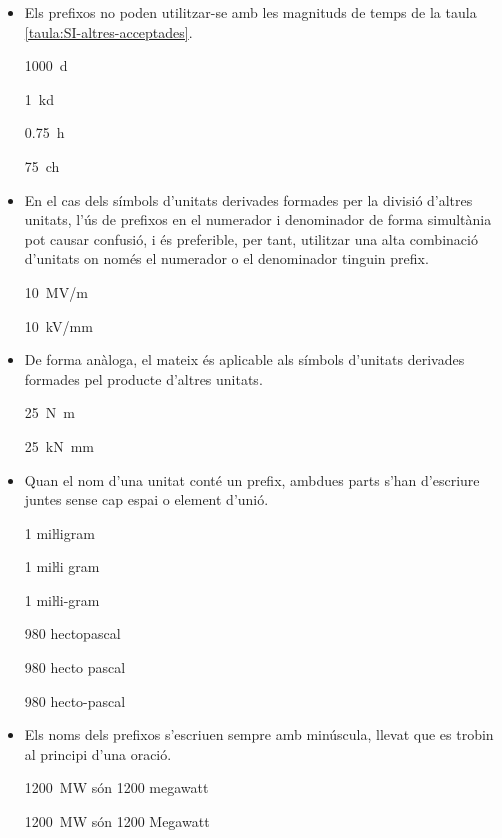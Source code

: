 \begin{itemize}
\item Els prefixos no poden utilitzar-se amb les magnituds  de temps de la taula \vref{taula:SI-altres-acceptades}.

\textcolor{Green}\faCheckSquare{} \qty{1000}{d}

\textcolor{Red}\faTimesCircle{}  \qty{1}{kd}

\textcolor{Green}\faCheckSquare{} \qty{0,75}{h}

\textcolor{Red}\faTimesCircle{}  \qty{75}{ch}


\item En el cas dels símbols d'unitats derivades formades per la divisió
d'altres unitats, l'ús de prefixos en el numerador i denominador de
forma simultània pot causar confusió, i és preferible, per tant,
utilitzar una alta combinació d'unitats on només el numerador o el
denominador tinguin prefix.

\textcolor{Green}\faCheckSquare{} \qty{10}{MV/m}

\textcolor{Blue}\faExclamationTriangle{}  \qty{10}{kV/mm}


\item De forma anàloga, el mateix és aplicable als símbols d'unitats
derivades formades pel producte d'altres unitats.

\textcolor{Green}\faCheckSquare{} \qty{25}{N.m}

\textcolor{Blue}\faExclamationTriangle{}  \qty{25}{kN.mm}


 \item Quan el nom d'una unitat
conté un prefix, ambdues parts s'han d'escriure juntes sense cap espai o element d'unió.

\textcolor{Green}\faCheckSquare{} 1 miŀligram

\textcolor{Red}\faTimesCircle{} 1 miŀli gram

\textcolor{Red}\faTimesCircle{} 1 miŀli-gram

\textcolor{Green}\faCheckSquare{}  980 hectopascal

\textcolor{Red}\faTimesCircle{} 980 hecto pascal

\textcolor{Red}\faTimesCircle{} 980 hecto-pascal


\item Els noms dels prefixos s'escriuen sempre amb minúscula, llevat que es trobin al principi d'una oració.

\textcolor{Green}\faCheckSquare{} \qty{1200}{MW} són 1200 megawatt

\textcolor{Red}\faTimesCircle{} \qty{1200}{MW} són 1200 Megawatt


\end{itemize}
